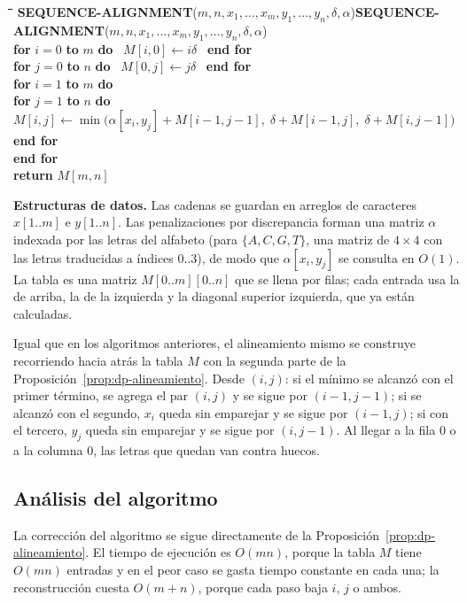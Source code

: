 \documentclass[12pt, spanish, oneside, openany]{book}
\newcommand{\pl}[1]{\makebox[1.6em][r]{\texttt{\footnotesize #1}}\hspace{0.9em}}
\newenvironment{pseudo}[1]{%
  \begin{center}%
  \begin{mdframed}[style=pseudobox]%
  \small
  \begin{tabbing}%
  \hspace{2.5em}\=\hspace{1.5em}\=\hspace{1.5em}\=\hspace{1.5em}\=\hspace{1.5em}\=\kill
  \def\pseudotitulo{#1}\ifx\pseudotitulo\empty\else#1\\[3pt]\fi}%
  {\end{tabbing}\end{mdframed}\end{center}}
\newenvironment{estructuras}%
  {\begin{center}\begin{minipage}{0.93\textwidth}\begin{mdframed}[style=estrbox]%
   \small\textbf{Estructuras de datos.}\;}%
  {\end{mdframed}\end{minipage}\end{center}}
\theoremstyle{uprightplain}
\theoremstyle{definition}
\theoremstyle{remark}
\theoremstyle{definition}
\begin{document}
\begin{pseudo}{\textbf{SEQUENCE-ALIGNMENT}($m, n, x_1,\dots,x_m, y_1,\dots,y_n, \delta, \alpha$)}
\pl{1}\> \textbf{for} $i = 0$ \textbf{to} $m$ \textbf{do} \ $M[i,0] \leftarrow i\delta$ \ \textbf{end for}\\
\pl{2}\> \textbf{for} $j = 0$ \textbf{to} $n$ \textbf{do} \ $M[0,j] \leftarrow j\delta$ \ \textbf{end for}\\
\pl{3}\> \textbf{for} $i = 1$ \textbf{to} $m$ \textbf{do}\\
\pl{4}\>\> \textbf{for} $j = 1$ \textbf{to} $n$ \textbf{do}\\
\pl{5}\>\>\> $M[i,j] \leftarrow \min\bigl(\alpha[x_i,y_j]+M[i-1,j-1],\; \delta+M[i-1,j],\; \delta+M[i,j-1]\bigr)$\\
\pl{6}\>\> \textbf{end for}\\
\pl{7}\> \textbf{end for}\\
\pl{8}\> \textbf{return} $M[m,n]$
\end{pseudo}

\begin{estructuras}
Las cadenas se guardan en arreglos de caracteres $x[1..m]$ e $y[1..n]$. Las
penalizaciones por discrepancia forman una matriz $\alpha$ indexada por las
letras del alfabeto (para $\{A,C,G,T\}$, una matriz de $4\times 4$ con las
letras traducidas a índices $0..3$), de modo que $\alpha[x_i,y_j]$ se consulta
en $O(1)$. La tabla es una matriz $M[0..m][0..n]$ que se llena por filas; cada
entrada usa la de arriba, la de la izquierda y la diagonal superior izquierda,
que ya están calculadas.
\end{estructuras}

Igual que en los algoritmos anteriores, el alineamiento mismo se construye recorriendo hacia atrás la tabla $M$ con la segunda parte de la Proposición~\ref{prop:dp-alineamiento}. Desde $(i,j)$: si el mínimo se alcanzó con el primer término, se agrega el par $(i,j)$ y se sigue por $(i-1,j-1)$; si se alcanzó con el segundo, $x_i$ queda sin emparejar y se sigue por $(i-1,j)$; si con el tercero, $y_j$ queda sin emparejar y se sigue por $(i,j-1)$. Al llegar a la fila $0$ o a la columna $0$, las letras que quedan van contra huecos.

\subsection{Análisis del algoritmo}

La corrección del algoritmo se sigue directamente de la Proposición~\ref{prop:dp-alineamiento}. El tiempo de ejecución es $O(mn)$, porque la tabla $M$ tiene $O(mn)$ entradas y en el peor caso se gasta tiempo constante en cada una; la reconstrucción cuesta $O(m+n)$, porque cada paso baja $i$, $j$ o ambos.
\end{document}
